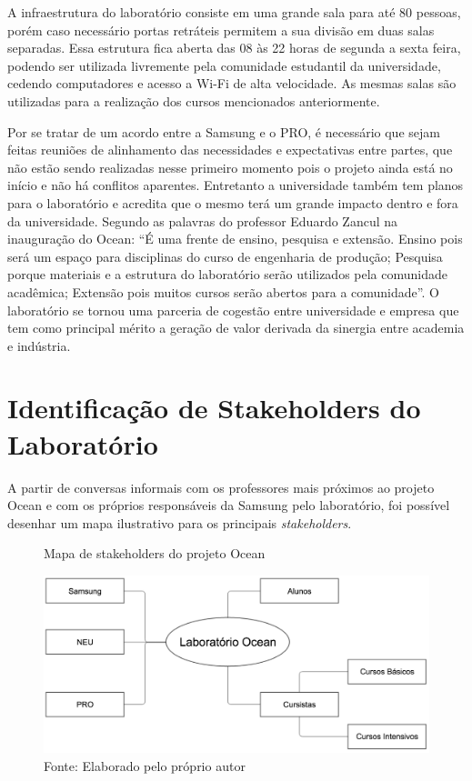 A infraestrutura do laboratório consiste em uma grande sala para até 80 pessoas, porém caso necessário portas retráteis permitem a sua divisão em duas salas separadas. Essa estrutura fica aberta das 08 às 22 horas de segunda a sexta feira, podendo ser utilizada livremente pela comunidade estudantil da universidade, cedendo computadores e acesso a Wi-Fi de alta velocidade. As mesmas salas são utilizadas para a realização dos cursos mencionados anteriormente.

Por se tratar de um acordo entre a Samsung e o PRO, é necessário que sejam feitas reuniões de alinhamento das necessidades e expectativas entre partes, que não estão sendo realizadas nesse primeiro momento pois o projeto ainda está no início e não há conflitos aparentes. Entretanto a universidade também tem planos para o laboratório e acredita que o mesmo terá um grande impacto dentro e fora da universidade. Segundo as palavras do professor Eduardo Zancul na inauguração do Ocean: “É uma frente de ensino, pesquisa e extensão. Ensino pois será um espaço para disciplinas do curso de engenharia de produção; Pesquisa porque materiais e a estrutura do laboratório serão utilizados pela comunidade acadêmica; Extensão pois muitos cursos serão abertos para a comunidade”. O laboratório se tornou uma parceria de cogestão entre universidade e empresa que tem como principal mérito a geração de valor derivada da sinergia entre academia e indústria. 

\section{Identificação de Stakeholders do Laboratório}
\label{sec:identificacao_stakeholders}

A partir de conversas informais com os professores mais próximos ao projeto Ocean e com os próprios responsáveis da Samsung pelo laboratório, foi possível desenhar um mapa ilustrativo para os principais \textit{stakeholders}.

\begin{figure}[H]
\caption{Mapa de stakeholders do projeto Ocean}
\centerline{\includegraphics[scale=0.5]{img/stakeholders_v2}}
\label{fig:stakeholders}
\caption* {Fonte: Elaborado pelo próprio autor}
\end{figure}


